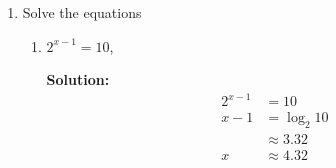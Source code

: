 \documentclass{report}
\newcommand{\sol}{\vspace{0.2cm}\textbf{Solution:}\vspace{0.2cm}}
\begin{document}
\begin{multicols*}{2}
\begin{enumerate}[leftmargin=*]
\begin{enumerate}[label=(\roman*)]
                        \sol{}
                        \begin{align*}
                            3^{y^2 + 3}    & = 9^{2y}          \\
                            3^{y^2 + 3}    & = 3^{4y}          \\
                            y^2 + 3        & = 4y              \\
                            y^2 - 4y + 3   & = 0               \\
                            (y - 1)(y - 3) & = 0               \\
                            y              & = 1 \text{ or } 3
                        \end{align*}

                  \item $\log _{z} 16=8$.

                        \sol{}
                        \begin{align*}
                            \log_z 16                   & = 8               \\
                            \dfrac{\log_2 16}{\log_2 z} & = 8               \\
                            \dfrac{4}{\log_2 z}         & = 8               \\
                            \log_2 z                    & = \dfrac{1}{2}    \\
                            z                           & = 2^{\frac{1}{2}} \\
                                                        & = \sqrt{2}
                        \end{align*}
              \end{enumerate}

        \item Solve the equations
              \begin{enumerate}[label=(\roman*)]
                  \item $2^{x-1}=10$,

                        \sol{}
                        \begin{align*}
                            2^{x-1} & = 10         \\
                            x - 1   & = \log_2 10  \\
                                    & \approx 3.32 \\
                            x       & \approx 4.32
                        \end{align*}


\end{enumerate}
\end{enumerate}
\end{multicols*}
\end{document}
